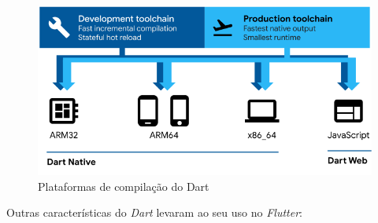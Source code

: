 \begin{figure}[!ht]
  \includegraphics[width=1\textwidth, keepaspectratio=true]{figuras/cap2/2_1_2_dart-platforms.png}
  \centering
  \caption[Plataformas de compilação do Dart]{Plataformas de compilação do Dart \protect\cite{dart-platforms}}
  \label{fig:dart_plataforms}
\end{figure}

Outras características do \textit{Dart} levaram ao seu uso no \textit{Flutter}:

